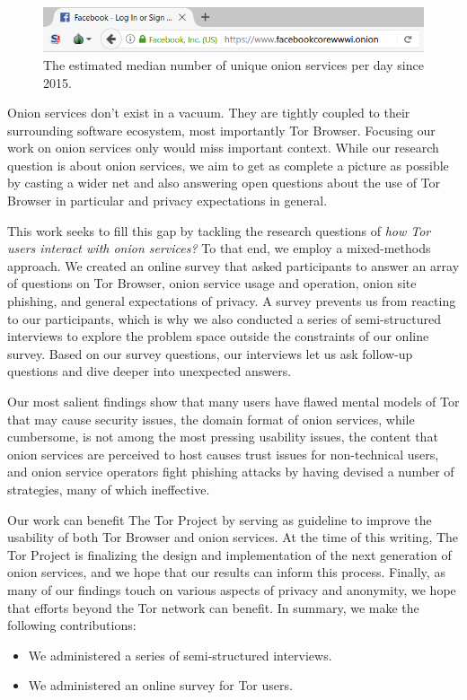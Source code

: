 \begin{figure}[t]
\includegraphics[width=\linewidth]{figures/onion-service-interface.png}
\caption{The estimated median number of unique onion services per day since
2015.}
\label{fig:os-interface}
\end{figure}

Onion services don't exist in a vacuum.  They are tightly coupled to their
surrounding software ecosystem, most importantly Tor Browser.  Focusing our work
on onion services only would miss important context.  While our research
question is about onion services, we aim to get as complete a picture as
possible by casting a wider net and also answering open questions about the use
of Tor Browser in particular and privacy expectations in general.

This work seeks to fill this gap by tackling the research questions of \emph{how
Tor users interact with onion services?}  To that end, we employ a mixed-methods
approach.  We created an online survey that asked participants to answer an
array of questions on Tor Browser, onion service usage and operation, onion site
phishing, and general expectations of privacy.  A survey prevents us from
reacting to our participants, which is why we also conducted a series of
semi-structured interviews to explore the problem space outside the constraints
of our online survey.  Based on our survey questions, our interviews let us ask
follow-up questions and dive deeper into unexpected answers.

Our most salient findings show that \first many users have flawed mental models
of Tor that may cause security issues, \second the domain format of onion
services, while cumbersome, is not among the most pressing usability issues,
\third the content that onion services are perceived to host causes trust issues
for non-technical users, and \fourth onion service operators fight phishing
attacks by having devised a number of strategies, many of which ineffective.

Our work can benefit The Tor Project by serving as guideline to improve the
usability of both Tor Browser and onion services.  At the time of this writing,
The Tor Project is finalizing the design and implementation of the next
generation of onion services, and we hope that our results can inform this
process.  Finally, as many of our findings touch on various aspects of privacy
and anonymity, we hope that efforts beyond the Tor network can benefit.  In
summary, we make the following contributions:
\begin{itemize}
    \item We administered a series of semi-structured interviews.
    \item We administered an online survey for Tor users.
\end{itemize}

